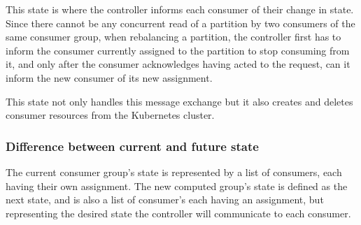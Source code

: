 This state is where the controller informs each consumer of their change in
state. Since there cannot be any concurrent read of a partition by two consumers
of the same consumer group, when rebalancing a partition, the controller first
has to inform the consumer currently assigned to the partition to stop consuming
from it, and only after the consumer acknowledges having acted to the request,
can it inform the new consumer of its new assignment.

This state not only handles this message exchange but it also creates and
deletes consumer resources from the Kubernetes cluster. 

\subsubsection{Difference between current and future state}

The current consumer group's state is represented by a list of consumers, each
having their own assignment. The new computed group's state is defined as the
next state, and is also a list of consumer's each having an assignment, but
representing the desired state the controller will communicate to each consumer.

